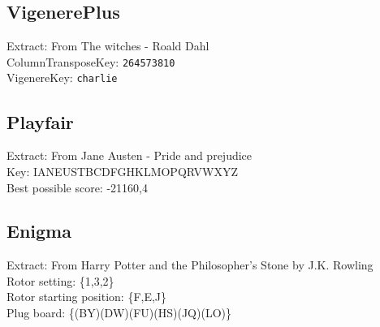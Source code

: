 \documentclass{article}
\begin{document}
\subsection{VigenerePlus}
Extract: From The witches - Roald Dahl\\
ColumnTransposeKey: \texttt{264573810}\\
VigenereKey: \texttt{charlie}\\

\subsection{Playfair}
Extract: From Jane Austen - Pride and prejudice\\
Key: IANEUSTBCDFGHKLMOPQRVWXYZ\\
Best possible score: -21160,4

\subsection{Enigma}

Extract: From Harry Potter and the Philosopher's Stone by J.K. Rowling\\
Rotor setting: \{1,3,2\}\\
Rotor starting position: \{F,E,J\}\\
Plug board: \{(BY)(DW)(FU)(HS)(JQ)(LO)\}\\
\end{document}
